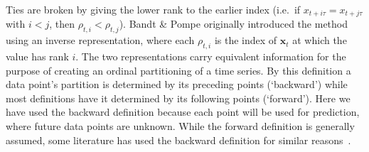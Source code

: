 Ties are broken by giving the lower rank to the earlier index (i.e.\ if 
\(x_{t+i\tau}=x_{t+j\tau}\) with \(i<j\), then \(\rho_{t,i}<\rho_{t,j}\)).  
Bandt \& Pompe originally introduced the method using an inverse representation, where each $\rho_{t,i}$ is the index of $\mathbf{x}_t$ at which the value has rank $i$. The two representations carry equivalent information for the purpose of creating an ordinal partitioning of a time series. By this definition a data point's partition is determined by its preceding points (`backward') while most definitions have it determined by its following points (`forward'). Here we have used the backward definition because each point will be used for prediction, where future data points are unknown. While the forward definition is generally assumed, some literature has used the backward definition for similar reasons~\cite{keller_2007}.

